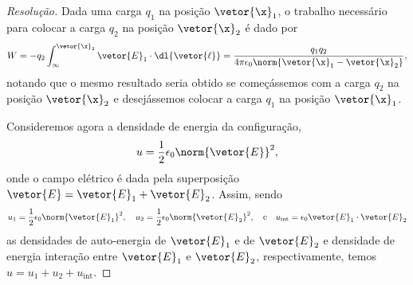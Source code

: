 \begin{proof}[Resolução]
    Dada uma carga \(q_1\) na posição \(\vetor{\x}_1\), o trabalho necessário para colocar a carga \(q_2\) na posição \(\vetor{\x}_2\) é dado por
    \begin{equation*}
        W = - q_2 \int_\infty^{\vetor{\x}_2} \vetor{E}_1 \cdot \dl{\vetor{\ell}} = \frac{q_1q_2}{4\pi \epsilon_0 \norm{\vetor{\x}_1 - \vetor{\x}_2}},
    \end{equation*}
    notando que o mesmo resultado seria obtido se começássemos com a carga \(q_2\) na posição \(\vetor{\x}_2\) e desejássemos colocar a carga \(q_1\) na posição \(\vetor{\x}_1\).

    Consideremos agora a densidade de energia da configuração,
    \begin{equation*}
        u = \frac12 \epsilon_0 \norm{\vetor{E}}^2,
    \end{equation*}
    onde o campo elétrico é dada pela superposição \(\vetor{E} = \vetor{E}_1 + \vetor{E}_2\). Assim, sendo
    \begin{equation*}
        u_1 = \frac12 \epsilon_0 \norm{\vetor{E}_1}^2,\quad
        u_2 = \frac12 \epsilon_0 \norm{\vetor{E}_2}^2,\quad\text{e}\quad
        u_\mathrm{int} = \epsilon_0 \vetor{E}_1\cdot\vetor{E}_2
    \end{equation*}
    as densidades de auto-energia de \(\vetor{E}_1\) e de \(\vetor{E}_2\) e densidade de energia interação entre \(\vetor{E}_1\) e \(\vetor{E}_2\), respectivamente, temos \(u = u_1 + u_2 + u_\mathrm{int}\).



\end{proof}
